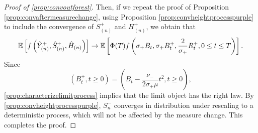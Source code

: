 \begin{proof}[Proof of \cref{prop:convoutforest}]
Then, if we repeat the proof of Proposition \ref{prop:convaftermeasurechange}, using Proposition  \ref{prop:convheightprocesspurple} to include the convergence of $S^+_{(n)}$ and $H^+_{(n)}$, we obtain that 
\begin{align*}
    {\mathbb E}\left[f\left(\hat{Y}^+_{(n)},\hat{S}^+_{(n)},  \hat{H}_{(n)}\right) \right]
    \to {\mathbb E}\left[\Phi(T)f\left(\sigma_+ B_t,\sigma_+ B^+_t,\frac{2}{\sigma_+}R^+_t,0\leq t \leq T\right)\right].
\end{align*}
Since $$(B^+_t,t\geq 0)=\left(B_t-\frac{\nu_-}{2\sigma_+ \mu}t^2,t\geq 0\right),$$
 \cref{prop:characterizelimitprocess} implies that the limit object has the right law. By \cref{prop:convheightprocesspurple}, $S^{-}_n$ converges in distribution under rescaling to a deterministic process, which will not be affected by the measure change. This completes the proof. 
\end{proof}

